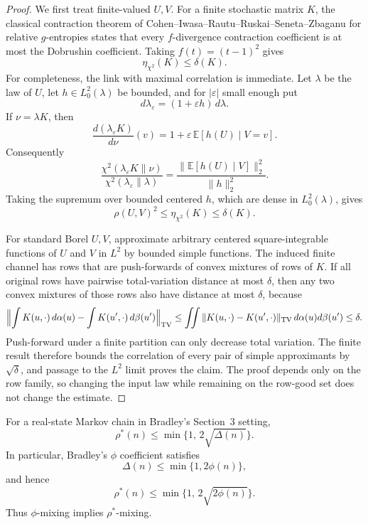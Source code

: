 \begin{proof}
We first treat finite-valued $U,V$.  For a finite stochastic matrix $K$, the
classical contraction theorem of Cohen--Iwasa--Rautu--Ruskai--Seneta--Zbaganu
for relative $g$-entropies states that every $f$-divergence contraction
coefficient is at most the Dobrushin coefficient.  Taking
$f(t)=(t-1)^2$ gives
\[
  \eta_{\chi^2}(K)\le\delta(K).
\]
For completeness, the link with maximal correlation is immediate.  Let
$\lambda$ be the law of $U$, let $h\in L^2_0(\lambda)$ be bounded, and for
$|\varepsilon|$ small enough put
\[
  d\lambda_\varepsilon=(1+\varepsilon h)\,d\lambda.
\]
If $\nu=\lambda K$, then
\[
 \frac{d(\lambda_\varepsilon K)}{d\nu}(v)
   =1+\varepsilon\,\mathbb E[h(U)\mid V=v].
\]
Consequently
\[
 \frac{\chi^2(\lambda_\varepsilon K\|\nu)}
      {\chi^2(\lambda_\varepsilon\|\lambda)}
 =\frac{\|\mathbb E[h(U)\mid V]\|_2^2}{\|h\|_2^2}.
\]
Taking the supremum over bounded centered $h$, which are dense in
$L^2_0(\lambda)$, gives
\[
  \rho(U,V)^2\le \eta_{\chi^2}(K)\le\delta(K).
\]

For standard Borel $U,V$, approximate arbitrary centered square-integrable
functions of $U$ and $V$ in $L^2$ by bounded simple functions.  The induced
finite channel has rows that are push-forwards of convex mixtures of rows of
$K$.  If all original rows have pairwise total-variation distance at most
$\delta$, then any two convex mixtures of those rows also have distance at
most $\delta$, because
\[
 \Bigl\|\int K(u,\cdot)\,d\alpha(u)-
        \int K(u',\cdot)\,d\beta(u')\Bigr\|_{\rm TV}
 \le \iint\|K(u,\cdot)-K(u',\cdot)\|_{\rm TV}
          \,d\alpha(u)d\beta(u')
 \le\delta.
\]
Push-forward under a finite partition can only decrease total variation.
The finite result therefore bounds the correlation of every pair of simple
approximants by $\sqrt\delta$, and passage to the $L^2$ limit proves the
claim.  The proof depends only on the row family, so changing the input law
while remaining on the row-good set does not change the estimate.
\end{proof}

\begin{theorem}
\label{thm:row-diameter-rhostar}
For a real-state Markov chain in Bradley's Section~3 setting,
\[
  \rho^*(n)\le \min\{1,\,2\sqrt{\Delta(n)}\}.
\]
In particular, Bradley's $\phi$ coefficient satisfies
\[
  \Delta(n)\le \min\{1,2\phi(n)\},
\]
and hence
\[
  \boxed{\rho^*(n)\le \min\{1,\,2\sqrt{2\phi(n)}\}.}
\]
Thus $\phi$-mixing implies $\rho^*$-mixing.
\end{theorem}

